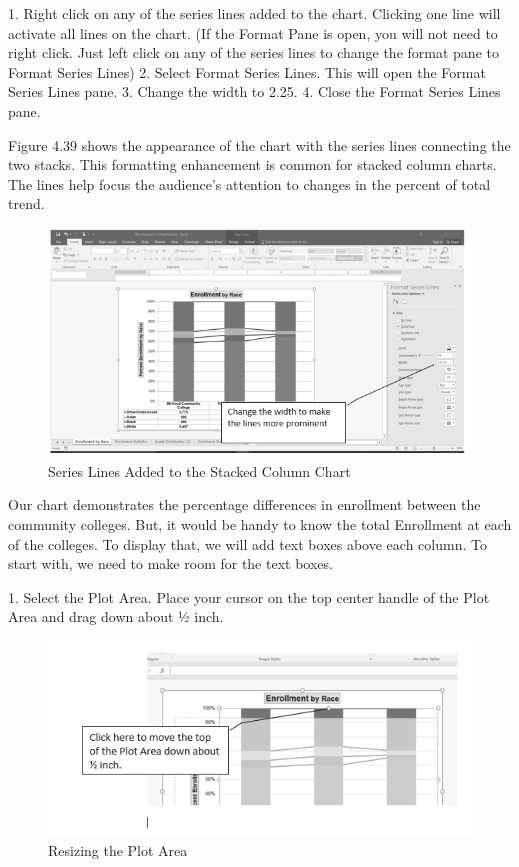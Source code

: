 1. Right click on any of the series lines added to the chart. Clicking one line will activate all lines
on the chart. (If the Format Pane is open, you will not need to right click. Just left click on any of
the series lines to change the format pane to Format Series Lines)
2. Select Format Series Lines. This will open the Format Series Lines pane.
3. Change the width to 2.25.
4. Close the Format Series Lines pane.

Figure 4.39 shows the appearance of the chart with the series lines connecting the two stacks. This
formatting enhancement is common for stacked column charts. The lines help focus the audience’s
attention to changes in the percent of total trend.



\begin{figure}[H]
	\centering
	\includegraphics[width=\maxwidth{.95\linewidth}]{gfx/ch04_fig40}
	\caption{Series Lines Added to the Stacked Column Chart}
	\label{04:fig40}
\end{figure}


Our chart demonstrates the percentage differences in enrollment between the community colleges.
But, it would be handy to know the total Enrollment at each of the colleges. To display that, we will
add text boxes above each column. To start with, we need to make room for the text boxes.

1. Select the Plot Area. Place your cursor on the top center handle of the Plot Area and drag down
about ½ inch.


\begin{figure}[H]
	\centering
	\includegraphics[width=\maxwidth{.95\linewidth}]{gfx/ch04_fig41}
	\caption{Resizing the Plot Area}
	\label{04:fig41}
\end{figure}


